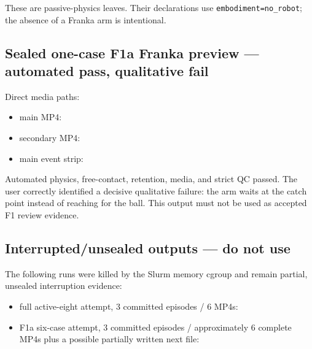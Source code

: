 \documentclass[11pt]{article}
\begin{document}
These are passive-physics leaves.  Their declarations use
\texttt{embodiment=no\_robot}; the absence of a Franka arm is intentional.

\subsection{Sealed one-case F1a Franka preview --- automated pass, qualitative fail}


Direct media paths:

\begin{itemize}
  \item main MP4:
  \item secondary MP4:
  \item main event strip:
\end{itemize}

Automated physics, free-contact, retention, media, and strict QC passed.  The
user correctly identified a decisive qualitative failure: the arm waits at
the catch point instead of reaching for the ball.  This output must not be
used as accepted F1 review evidence.

\subsection{Interrupted/unsealed outputs --- do not use}

The following runs were killed by the Slurm memory cgroup and remain partial,
unsealed interruption evidence:

\begin{itemize}
  \item full active-eight attempt, 3 committed episodes / 6 MP4s:
  \item F1a six-case attempt, 3 committed episodes / approximately 6 complete
        MP4s plus a possible partially written next file:
\end{itemize}
\end{document}
